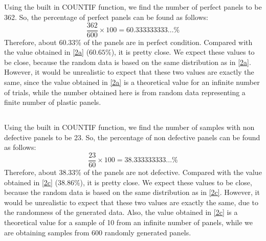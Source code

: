 \documentclass[letterpaper]{article}
\begin{document}
\subsection{}%
Using the built in COUNTIF function, we find the number of perfect panels to be
362. So, the percentage of perfect panels can be found as follows:
$$\frac{362}{600}\times 100 = 60.333333333...\%$$
Therefore, about $60.33\%$ of the panels are in perfect condition. Compared with
the value obtained in \ref{2a} ($60.65\%$), it is pretty close. We expect these
values to be close, because the random data is based on the same distribution as
in \ref{2a}. However, it would be unrealistic to expect that these two values
are exactly the same, since the value obtained in \ref{2a} is a theoretical
value for an infinite number of trials, while the number obtained here is from
random data representing a finite number of plastic panels.


\subsection{}%
Using the built in COUNTIF function, we find the number of samples with non
defective panels to be 23. So, the percentage of non defective panels can be
found as follows:
$$\frac{23}{60}\times 100 = 38.333333333...\%$$
Therefore, about $38.33\%$ of the panels are not defective. Compared with the
value obtained in \ref{2c} ($38.86\%$), it is pretty close. We expect these
values to be close, because the random data is based on the same distribution as
in \ref{2c}. However, it would be unrealistic to expect that these two values
are exactly the same, due to the randomness of the generated data. Also, the
value obtained in \ref{2c} is a theoretical value for a sample of 10 from an
infinite number of panels, while we are obtaining samples from 600 randomly
generated panels.
\end{document}
